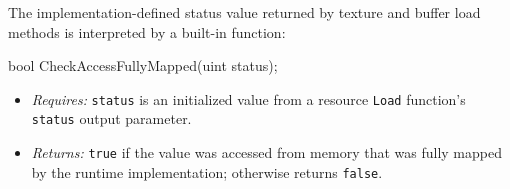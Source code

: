 
\p The implementation-defined status value returned by texture and buffer load
methods is interpreted by a built-in function:

\begin{HLSL}
bool CheckAccessFullyMapped(uint status);
\end{HLSL}

\begin{itemize}
  \item \textit{Requires:} \texttt{status} is an initialized value from a
  resource \texttt{Load} function's \texttt{status} output parameter.
  \item \textit{Returns:} \texttt{true} if the value was accessed from memory
  that was fully mapped by the runtime implementation; otherwise returns
  \texttt{false}.
\end{itemize}

